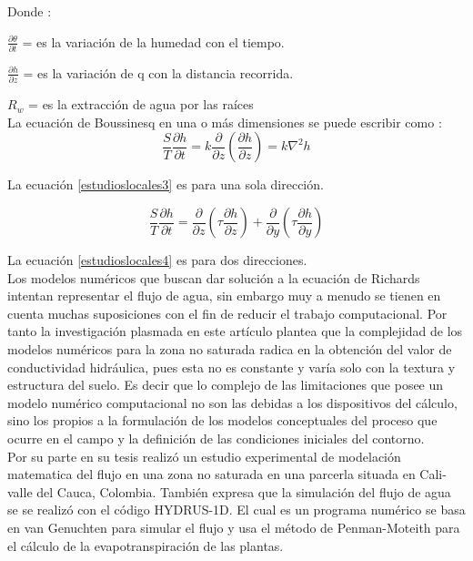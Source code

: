 Donde :

$\frac{\partial \theta }{\partial t}$  =  es la variación de la humedad con el tiempo.  

$\frac{\partial h }{\partial z}$  =  es la variación de q con la distancia recorrida.

$R_{w}$ = es la extracción de agua por las raíces \\

La ecuación de Boussinesq en una o más dimensiones se puede escribir como :
\begin{equation}
	\frac{S}{T} \frac{\partial h}{\partial t} = k\frac{\partial }{\partial z}\left ( \frac{\partial h }{\partial z} \right ) = k\nabla^2h
	\label{estudioslocales3}
\end{equation}

La ecuación \eqref{estudioslocales3} es para una sola dirección. 

\begin{equation}
	\frac{S}{T} \frac{\partial h}{\partial t} =\frac{\partial }{\partial z}\left ( \tau\frac{\partial h }{\partial z}  \right ) + \frac{\partial }{\partial y}\left ( \tau\frac{\partial h }{\partial y}  \right )
	\label{estudioslocales4}
\end{equation}

La ecuación \eqref{estudioslocales4} es para dos direcciones.\\

Los modelos numéricos que buscan dar solución a la ecuación de Richards intentan representar el flujo de agua, sin embargo muy a menudo se tienen en cuenta muchas suposiciones con el fin de reducir el trabajo computacional. Por tanto la investigación plasmada en este artículo plantea que la complejidad de los modelos numéricos para la zona no saturada radica en la obtención del valor de conductividad hidráulica, pues esta no es constante y varía solo con la textura y estructura del suelo.  Es decir que lo complejo de las limitaciones que posee un modelo numérico computacional no son las debidas a los dispositivos del cálculo, sino los propios a la formulación de los modelos conceptuales del proceso que ocurre en el campo y la definición de las condiciones iniciales del contorno.\\


Por su parte \parencite{garcia2017modelacion}  en su tesis realizó un estudio experimental de modelación matematica del flujo en una zona no saturada en una parcerla situada en Cali- valle del Cauca, Colombia. También expresa que la simulación del flujo de agua se se realizó  con el código HYDRUS-1D. El cual es un programa numérico se basa en van Genuchten para simular el flujo y usa el método de Penman-Moteith para el cálculo de la evapotranspiración de las plantas.\\

